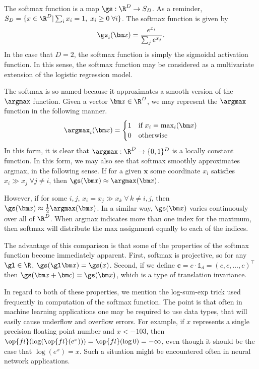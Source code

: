 
The softmax function is a map \(\gs:\R^D \rightarrow S_D\). As a reminder,
 \(S_D = \{x\in\R^D|\sum_i x_i = 1, \; x_i\geq 0 \; \forall i\}\). The softmax function is given by
 \[\gs_i(\bm x) = \frac{e^{x_i}}{\sum_j e^{x_j}}.\]
 In the case that \(D=2\), the softmax function is simply the sigmoidal 
 activation function. In this sense, the softmax function may be considered as
 a multivariate extension of the logistic regression model.

 The softmax is so named because it approximates a smooth version of the 
 \(\argmax\) function.   Given a vector \(\bm x\in \R^{D}\), we may 
 represent the \(\argmax\) function in the following manner.
 \begin{equation*}
	 \argmax_i(\bm x) = 
	 \begin{cases}
	 	1 & \text{if } x_i = \max_i(\bm x)\\
	 	0 & \text{otherwise}
	 \end{cases}
 \end{equation*}
 In this form, it is clear that \(\argmax:\R^D\rightarrow \{0,1\}^{D}\) is 
 a locally constant function.  In this form, we may also see that softmax 
 smoothly approximates argmax, in the following sense.  If for a given 
 \(\bm x\) some coordinate \(x_i\) satisfies \(x_i\gg x_j\;\forall j\neq i\), 
 then \(\gs(\bm x) \approx \argmax(\bm x)\).

 However, if for some \(i,j\), \(x_i=x_j\gg x_k\;\forall\, k\neq i,j\), then 
 \(\gs(\bm x) \approx \frac 12 \argmax(\bm x)\).  In a similar way, 
 \(\gs(\bm x)\) varies continuously over all of \(\R^D\). When argmax 
 indicates more than one index for the maximum, then softmax will distribute 
 the max assignment equally to each of the indices.

 The advantage of this comparison is that some of the properties of the 
 softmax function become immediately apparent.  First, softmax is projective, 
 so for any \(\gl \in\R\), \(\gs(\gl\bm x) = \gs(x)\). Second, if we define 
 \(\bm c = c\cdot \mathbb{1}_d = (c,c,\ldots,c)^{\intercal}\) then 
 \(\gs(\bm x+\bm c)=\gs(\bm x)\), which is a type of translation invariance.

 In regard to both of these properties, we mention the log-sum-exp trick used 
 frequently in computation of the softmax function. The point is that often in 
 machine learning applications one may be required to use data types, that 
 will easily cause underflow and overflow errors.  For example, if \(x\) 
 represents a single precision floating point number and \(x<-103\), then 
 \(\op{fl}(\log(\op{fl}(e^x))) = \op{fl}(\log 0) = -\infty\), even though it 
 should be the case that \(\log(e^x) = x\). Such a situation might be 
 encountered often in neural network applications.

